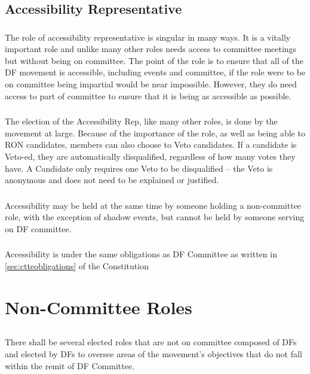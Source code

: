 \documentclass[a4paper, 11pt]{report}
\begin{document}
\subsection{Accessibility Representative}
\subsubsection{}
The role of accessibility representative is singular in many ways. It is a vitally important role and unlike many other roles needs access to committee meetings but without being on committee. The point of the role is to ensure that all of the DF movement is accessible, including events and committee, if the role were to be on committee being impartial would be near impossible. However, they do need access to part of committee to ensure that it is being as accessible as possible.
\subsubsection{}
The election of the Accessibility Rep, like many other roles, is done by the movement at large. Because of the importance of the role, as well as being able to RON candidates, members can also choose to Veto candidates. If a candidate is Veto-ed, they are automatically disqualified, regardless of how many votes they have. A Candidate only requires one Veto to be disqualified – the Veto is anonymous and does not need to be explained or justified.
\subsubsection{}
Accessibility may be held at the same time by someone holding a non-committee role, with the exception of shadow events, but cannot be held by someone serving on DF committee.
\subsubsection{}
Accessibility is under the same obligations as DF Committee as written in \ref{sec:ctteobligations} of the Constitution


\section{Non-Committee Roles}

\subsection{}
There shall be several elected roles that are not on committee composed of DFs and elected by DFs to oversee areas of the movement’s objectives that do not fall within the remit of DF Committee.
\end{document}
